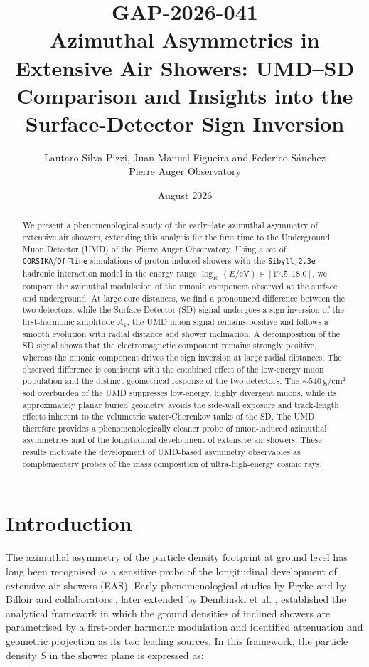 \documentclass[11pt,a4paper]{article}
\title{
    \hfill {\normalsize \textbf{GAP-2026-041}} \\[2em]
    Azimuthal Asymmetries in Extensive Air Showers: UMD–SD Comparison and Insights into the Surface-Detector Sign Inversion
}
\author{Lautaro Silva Pizzi, Juan Manuel Figueira and Federico S\'anchez \\ Pierre Auger Observatory}
\date{August 2026}
\begin{document}
\maketitle

\begin{abstract}
We present a phenomenological study of the early--late azimuthal asymmetry of extensive air showers, extending this analysis for the first time to the Underground Muon Detector (UMD) of the Pierre Auger Observatory. Using a set of \texttt{CORSIKA}/\texttt{Offline} simulations of proton-induced showers with the \texttt{Sibyll,2.3e} hadronic interaction model in the energy range $\log_{10}(E/\mathrm{eV})\in[17.5,18.0]$, we compare the azimuthal modulation of the muonic component observed at the surface and underground. At large core distances, we find a pronounced difference between the two detectors: while the Surface Detector (SD) signal undergoes a sign inversion of the first-harmonic amplitude $A_1$, the UMD muon signal remains positive and follows a smooth evolution with radial distance and shower inclination. A decomposition of the SD signal shows that the electromagnetic component remains strongly positive, whereas the muonic component drives the sign inversion at large radial distances. The observed difference is consistent with the combined effect of the low-energy muon population and the distinct geometrical response of the two detectors. The $\sim540~\mathrm{g/cm^2}$ soil overburden of the UMD suppresses low-energy, highly divergent muons, while its approximately planar buried geometry avoids the side-wall exposure and track-length effects inherent to the volumetric water-Cherenkov tanks of the SD. The UMD therefore provides a phenomenologically cleaner probe of muon-induced azimuthal asymmetries and of the longitudinal development of extensive air showers. These results motivate the development of UMD-based asymmetry observables as complementary probes of the mass composition of ultra-high-energy cosmic rays.
\end{abstract}

\section{Introduction}
\label{sec:intro}

The azimuthal asymmetry of the particle density footprint at ground level has long been recognised as a sensitive probe of the longitudinal development of extensive air showers (EAS). Early phenomenological studies by Pryke \cite{Pryke1998} and by Billoir and collaborators \cite{Billoir2002, GAP2000_017}, later extended by Dembinski et al. \cite{GAP2007_124}, established the analytical framework in which the ground densities of inclined showers are parametrised by a first-order harmonic modulation and identified attenuation and geometric projection as its two leading sources. In this framework, the particle density $S$ in the shower plane is expressed as:
\end{document}
